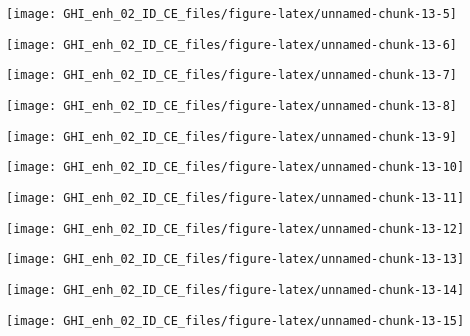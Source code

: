 \documentclass[
  10pt,
  a4paper,oneside]{article}
\begin{document}
\begin{center}\texttt{[image: GHI\_enh\_02\_ID\_CE\_files/figure-latex/unnamed-chunk-13-5]} \end{center}

\begin{center}\texttt{[image: GHI\_enh\_02\_ID\_CE\_files/figure-latex/unnamed-chunk-13-6]} \end{center}

\begin{center}\texttt{[image: GHI\_enh\_02\_ID\_CE\_files/figure-latex/unnamed-chunk-13-7]} \end{center}

\begin{center}\texttt{[image: GHI\_enh\_02\_ID\_CE\_files/figure-latex/unnamed-chunk-13-8]} \end{center}

\begin{center}\texttt{[image: GHI\_enh\_02\_ID\_CE\_files/figure-latex/unnamed-chunk-13-9]} \end{center}

\begin{center}\texttt{[image: GHI\_enh\_02\_ID\_CE\_files/figure-latex/unnamed-chunk-13-10]} \end{center}

\begin{center}\texttt{[image: GHI\_enh\_02\_ID\_CE\_files/figure-latex/unnamed-chunk-13-11]} \end{center}

\begin{center}\texttt{[image: GHI\_enh\_02\_ID\_CE\_files/figure-latex/unnamed-chunk-13-12]} \end{center}

\begin{center}\texttt{[image: GHI\_enh\_02\_ID\_CE\_files/figure-latex/unnamed-chunk-13-13]} \end{center}

\begin{center}\texttt{[image: GHI\_enh\_02\_ID\_CE\_files/figure-latex/unnamed-chunk-13-14]} \end{center}

\begin{center}\texttt{[image: GHI\_enh\_02\_ID\_CE\_files/figure-latex/unnamed-chunk-13-15]} \end{center}
\end{document}
